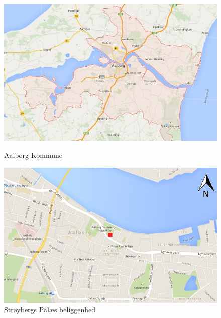 \begin{figure}[htbp] \centering
	\begin{minipage}[b]{0.48\textwidth}\centering
		\includegraphics[width=1.0\textwidth]{billeder/aalborgkommune.png}
		\caption{Aalborg Kommune}
		\label{fig:aalborgkommune}
	\end{minipage}\hfill
	\begin{minipage}[b]{0.48\textwidth}\centering
		\centering
		\includegraphics[width=1.0\textwidth]{billeder/aalborg.png}
		\caption{Strøybergs Palæs beliggenhed}
		\label{fig:aalborg}
	\end{minipage}
\end{figure}